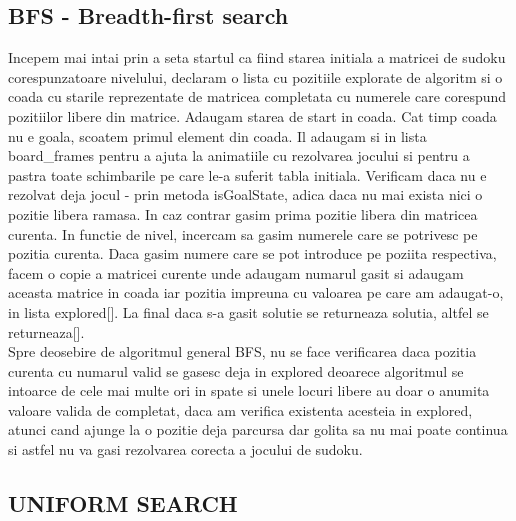 \documentclass[a4paper,18pt]{article}
\begin{document}
\subsection{ BFS - Breadth-first search}

\tab Incepem mai intai prin a seta startul ca fiind starea initiala a matricei de sudoku corespunzatoare nivelului, declaram o lista cu pozitiile explorate de algoritm si o coada cu starile reprezentate de matricea completata cu numerele care corespund pozitiilor libere din matrice. Adaugam starea de start in coada. Cat timp coada nu e goala, scoatem primul element din coada. Il adaugam si in lista board\_frames pentru a ajuta la animatiile cu rezolvarea jocului si pentru a pastra toate schimbarile pe care le-a suferit tabla initiala. Verificam daca nu e rezolvat deja jocul - prin metoda isGoalState, adica daca nu mai exista nici o pozitie libera ramasa. In caz contrar gasim prima pozitie libera din matricea curenta. In functie de nivel, incercam sa gasim numerele care se potrivesc pe pozitia curenta. Daca gasim numere care se pot introduce pe poziita respectiva, facem o copie a matricei curente unde adaugam numarul gasit si adaugam aceasta matrice in coada iar pozitia impreuna cu valoarea pe care am adaugat-o, in lista explored[]. La final daca s-a gasit solutie se returneaza solutia, altfel se returneaza[].
\newline 
\\ \indent Spre deosebire de algoritmul general BFS, nu se face verificarea daca pozitia curenta cu numarul valid se gasesc deja in explored deoarece algoritmul se intoarce de cele mai multe ori in spate si unele locuri libere au doar o anumita valoare valida de completat, daca am verifica existenta acesteia in explored, atunci cand ajunge la o pozitie deja parcursa dar golita sa nu mai poate continua si astfel nu va gasi rezolvarea corecta a jocului de sudoku.

\subsection{ UNIFORM SEARCH}
\end{document}
